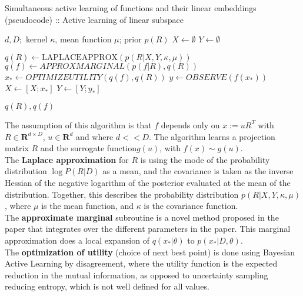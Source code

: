 \begin{algorithm}
\caption{Simultaneous active learning of functions and their linear embeddings (pseudocode) :: Active learning of linear subspace \citep{Garnett2013}}

\begin{algorithmic} 
\REQUIRE $d, D;$ kernel $\kappa$, mean function $\mu$; prior $p(R)$ 
\STATE $X \leftarrow \emptyset$
\STATE $Y \leftarrow \emptyset$

\STATE $ q(R) \leftarrow \text{LAPLACEAPPROX}( p(R | X, Y, \kappa, \mu) ) $
\STATE $ q(f) \leftarrow  APPROXMARGINAL( p(f | R), q(R)) $
\STATE $ x_* \leftarrow OPTIMIZEUTILITY( q(f), q(R) )$
\STATE $ y \leftarrow OBSERVE( f( x_* ) ) $
\STATE $ X \leftarrow [X; x_*] $
\STATE $ Y \leftarrow[Y; y_*] $
\ENDWHILE

\RETURN $q(R), q(f)$
\end{algorithmic}

\end{algorithm}

\citep{Garnett2013} The assumption of this algorithm is that $f$ depends only on $ x := uR^T $ with $ R \in \mathbf{R}^{d \times D}$, $ u \in \mathbf{R}^d $ and where $d << D$. 
The algorithm learns a projection matrix $R$ and the surrogate function$g(u)$, with $f(x) \sim g(u) $. \\

The \textbf{Laplace approximation} for $R$ is using the mode of the probability distribution $\log P (R | D) $ as a mean, and the covariance is taken as the inverse Hessian of the negative logarithm of the posterior evaluated at the mean of the distribution.
Together, this describes the probability distribution $p(R|X, Y, \kappa, \mu )$, where $\mu$ is the mean function, and $\kappa$ is the covariance function.\\

The \textbf{approximate marginal} subroutine is a novel method proposed in the paper that integrates over the different parameters in the paper.
This marginal approximation does a local expansion of $q(x_* | \theta) $ to $p(x_* | D, \theta)$. \\

The \textbf{optimization of utility} (choice of next best point) is done using Bayesian Active Learning by disagreement, where the utility function is the expected reduction in the mutual information, as opposed to uncertainty sampling reducing entropy, which  is not well defined for all values. \\

